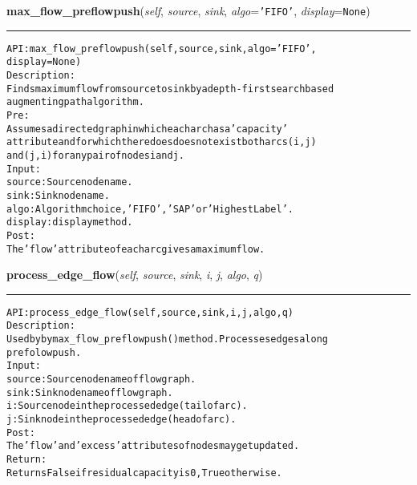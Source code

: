 \hspace{.8\funcindent}\begin{boxedminipage}{\funcwidth}

    \raggedright \textbf{max\_flow\_preflowpush}(\textit{self}, \textit{source}, \textit{sink}, \textit{algo}={\tt \texttt{'}\texttt{FIFO}\texttt{'}}, \textit{display}={\tt None})

    \vspace{-1.5ex}

    \rule{\textwidth}{0.5\fboxrule}
\setlength{\parskip}{2ex}
\begin{alltt}

API: max\_flow\_preflowpush(self, source, sink, algo = 'FIFO',
                          display = None)
Description:
Finds maximum flow from source to sink by a depth-first search based
augmenting path algorithm.
Pre:
     Assumes a directed graph in which each arc has a 'capacity'
     attribute and for which there does does not exist both arcs (i,j)
     and (j,i) for any pair of nodes i and j.
Input:
    source: Source node name.
    sink: Sink node name.
    algo: Algorithm choice, 'FIFO', 'SAP' or 'HighestLabel'.
    display: display method.
Post:
    The 'flow' attribute of each arc gives a maximum flow.
\end{alltt}

\setlength{\parskip}{1ex}
    \end{boxedminipage}

    \label{coinor:gimpy:graph:Graph:process_edge_flow}

    \vspace{0.5ex}

\hspace{.8\funcindent}\begin{boxedminipage}{\funcwidth}

    \raggedright \textbf{process\_edge\_flow}(\textit{self}, \textit{source}, \textit{sink}, \textit{i}, \textit{j}, \textit{algo}, \textit{q})

    \vspace{-1.5ex}

    \rule{\textwidth}{0.5\fboxrule}
\setlength{\parskip}{2ex}
\begin{alltt}

API: process\_edge\_flow(self, source, sink, i, j, algo, q)
Description:
Used by by max\_flow\_preflowpush() method. Processes edges along
prefolow push.
Input:
    source: Source node name of flow graph.
    sink: Sink node name of flow graph.
    i: Source node in the processed edge (tail of arc).
    j: Sink node in the processed edge (head of arc).
Post:
    The 'flow' and 'excess' attributes of nodes may get updated.
Return:
    Returns False if residual capacity is 0, True otherwise.
\end{alltt}

\setlength{\parskip}{1ex}
    \end{boxedminipage}

